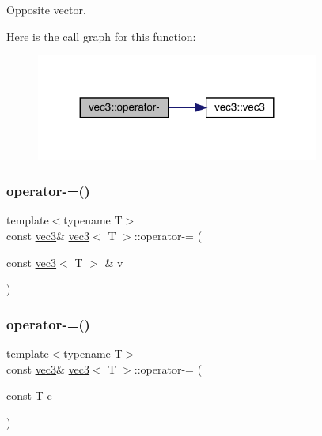 Opposite vector. 

Here is the call graph for this function\+:\nopagebreak
\begin{figure}[H]
\begin{center}
\leavevmode
\includegraphics[width=263pt]{structvec3_a9ee0d5d83bd70141b9424928d0ea9c98_cgraph}
\end{center}
\end{figure}
\mbox{\label{structvec3_a6302bef90ffb5d572b9d452d902266c5}} 
\subsubsection{\texorpdfstring{operator-\/=()}{operator-=()}\hspace{0.1cm}{\footnotesize\ttfamily [1/2]}}
{\footnotesize\ttfamily template$<$typename T$>$ \\
const \mbox{\hyperlink{structvec3}{vec3}}\& \mbox{\hyperlink{structvec3}{vec3}}$<$ T $>$\+::operator-\/= (\begin{DoxyParamCaption}\item[{const \mbox{\hyperlink{structvec3}{vec3}}$<$ T $>$ \&}]{v }\end{DoxyParamCaption})\hspace{0.3cm}{\ttfamily [inline]}}

\mbox{\label{structvec3_ac7fa0e349317986caa29b4450612f164}} 
\subsubsection{\texorpdfstring{operator-\/=()}{operator-=()}\hspace{0.1cm}{\footnotesize\ttfamily [2/2]}}
{\footnotesize\ttfamily template$<$typename T$>$ \\
const \mbox{\hyperlink{structvec3}{vec3}}\& \mbox{\hyperlink{structvec3}{vec3}}$<$ T $>$\+::operator-\/= (\begin{DoxyParamCaption}\item[{const T}]{c }\end{DoxyParamCaption})\hspace{0.3cm}{\ttfamily [inline]}}

